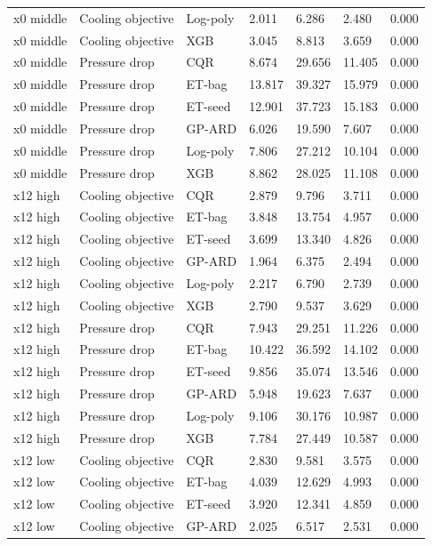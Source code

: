 \begin{longtable}{lllllll}
x0 middle & Cooling objective & Log-poly & 2.011 & 6.286 & 2.480 & 0.000\\
x0 middle & Cooling objective & XGB & 3.045 & 8.813 & 3.659 & 0.000\\
x0 middle & Pressure drop & CQR & 8.674 & 29.656 & 11.405 & 0.000\\
x0 middle & Pressure drop & ET-bag & 13.817 & 39.327 & 15.979 & 0.000\\
x0 middle & Pressure drop & ET-seed & 12.901 & 37.723 & 15.183 & 0.000\\
x0 middle & Pressure drop & GP-ARD & 6.026 & 19.590 & 7.607 & 0.000\\
x0 middle & Pressure drop & Log-poly & 7.806 & 27.212 & 10.104 & 0.000\\
x0 middle & Pressure drop & XGB & 8.862 & 28.025 & 11.108 & 0.000\\
x12 high & Cooling objective & CQR & 2.879 & 9.796 & 3.711 & 0.000\\
x12 high & Cooling objective & ET-bag & 3.848 & 13.754 & 4.957 & 0.000\\
x12 high & Cooling objective & ET-seed & 3.699 & 13.340 & 4.826 & 0.000\\
x12 high & Cooling objective & GP-ARD & 1.964 & 6.375 & 2.494 & 0.000\\
x12 high & Cooling objective & Log-poly & 2.217 & 6.790 & 2.739 & 0.000\\
x12 high & Cooling objective & XGB & 2.790 & 9.537 & 3.629 & 0.000\\
x12 high & Pressure drop & CQR & 7.943 & 29.251 & 11.226 & 0.000\\
x12 high & Pressure drop & ET-bag & 10.422 & 36.592 & 14.102 & 0.000\\
x12 high & Pressure drop & ET-seed & 9.856 & 35.074 & 13.546 & 0.000\\
x12 high & Pressure drop & GP-ARD & 5.948 & 19.623 & 7.637 & 0.000\\
x12 high & Pressure drop & Log-poly & 9.106 & 30.176 & 10.987 & 0.000\\
x12 high & Pressure drop & XGB & 7.784 & 27.449 & 10.587 & 0.000\\
x12 low & Cooling objective & CQR & 2.830 & 9.581 & 3.575 & 0.000\\
x12 low & Cooling objective & ET-bag & 4.039 & 12.629 & 4.993 & 0.000\\
x12 low & Cooling objective & ET-seed & 3.920 & 12.341 & 4.859 & 0.000\\
x12 low & Cooling objective & GP-ARD & 2.025 & 6.517 & 2.531 & 0.000\\

\end{longtable}
